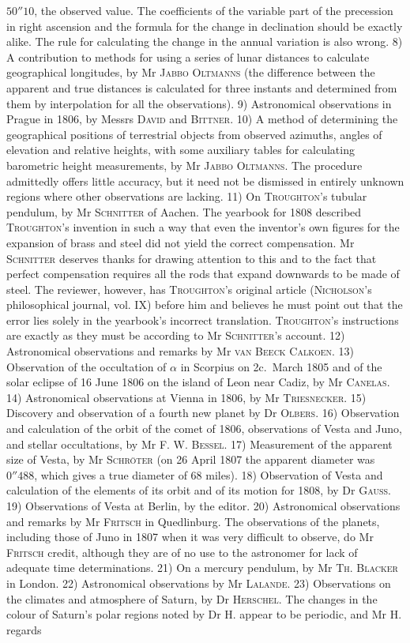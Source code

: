 $50''10$, the observed value. The coefficients of the variable part of the precession in right ascension and the formula for the change in declination should be exactly alike. The rule for calculating the change in the annual variation is also wrong. 8) A contribution to methods for using a series of lunar distances to calculate geographical longitudes, by Mr \textsc{Jabbo Oltmanns} (the difference between the apparent and true distances is calculated for three instants and determined from them by interpolation for all the observations). 9) Astronomical observations in Prague in 1806, by Messrs \textsc{David} and \textsc{Bittner}. 10) A method of determining the geographical positions of terrestrial objects from observed azimuths, angles of elevation and relative heights, with some auxiliary tables for calculating barometric height measurements, by Mr \textsc{Jabbo Oltmanns}. The procedure admittedly offers little accuracy, but it need not be dismissed in entirely unknown regions where other observations are lacking. 11) On \textsc{Troughton}’s tubular pendulum, by Mr \textsc{Schnitter} of Aachen. The yearbook for 1808 described \textsc{Troughton}’s invention in such a way that even the inventor’s own figures for the expansion of brass and steel did not yield the correct compensation. Mr \textsc{Schnitter} deserves thanks for drawing attention to this and to the fact that perfect compensation requires all the rods that expand downwards to be made of steel. The reviewer, however, has \textsc{Troughton}’s original article (\textsc{Nicholson}’s philosophical journal, vol. IX) before him and believes he must point out that the error lies solely in the yearbook’s incorrect translation. \textsc{Troughton}’s instructions are exactly as they must be according to Mr \textsc{Schnitter}’s account. 12) Astronomical observations and remarks by Mr \textsc{van Beeck Calkoen}. 13) Observation of the occultation of $\alpha$ in Scorpius on 2c.\ March 1805 and of the solar eclipse of 16 June 1806 on the island of Leon near Cadiz, by Mr \textsc{Canelas}. 14) Astronomical observations at Vienna in 1806, by Mr \textsc{Triesnecker}. 15) Discovery and observation of a fourth new planet by Dr \textsc{Olbers}. 16) Observation and calculation of the orbit of the comet of 1806, observations of Vesta and Juno, and stellar occultations, by Mr F. W. \textsc{Bessel}. 17) Measurement of the apparent size of Vesta, by Mr \textsc{Schröter} (on 26 April 1807 the apparent diameter was $0''488$, which gives a true diameter of 68 miles). 18) Observation of Vesta and calculation of the elements of its orbit and of its motion for 1808, by Dr \textsc{Gauss}. 19) Observations of Vesta at Berlin, by the editor. 20) Astronomical observations and remarks by Mr \textsc{Fritsch} in Quedlinburg. The observations of the planets, including those of Juno in 1807 when it was very difficult to observe, do Mr \textsc{Fritsch} credit, although they are of no use to the astronomer for lack of adequate time determinations. 21) On a mercury pendulum, by Mr \textsc{Th. Blacker} in London. 22) Astronomical observations by Mr \textsc{Lalande}. 23) Observations on the climates and atmosphere of Saturn, by Dr \textsc{Herschel}. The changes in the colour of Saturn’s polar regions noted by Dr H. appear to be periodic, and Mr H. regards 